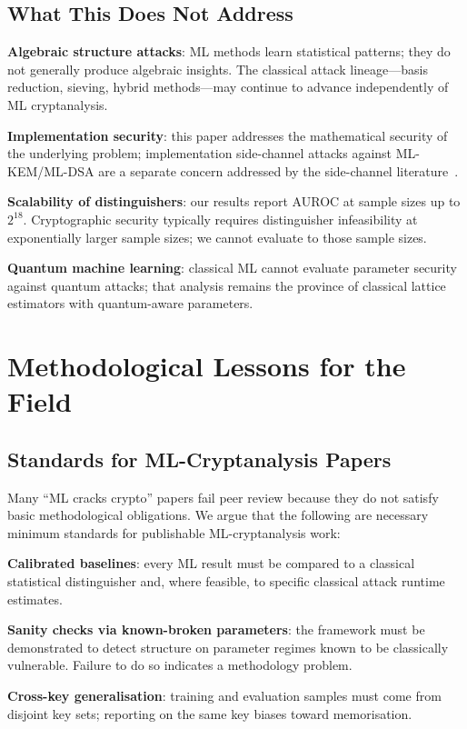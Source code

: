 \documentclass[sigconf,nonacm]{acmart}
\begin{document}
\subsection{What This Does Not Address}

\textbf{Algebraic structure attacks}: ML methods learn statistical
patterns; they do not generally produce algebraic insights. The
classical attack lineage---basis reduction, sieving, hybrid
methods---may continue to advance independently of ML cryptanalysis.

\textbf{Implementation security}: this paper addresses the
mathematical security of the underlying problem; implementation
side-channel attacks against ML-KEM/ML-DSA are a separate concern
addressed by the side-channel literature~\cite{karayalcin2024kyber}.

\textbf{Scalability of distinguishers}: our results report AUROC at
sample sizes up to $2^{18}$. Cryptographic security typically
requires distinguisher infeasibility at exponentially larger
sample sizes; we cannot evaluate to those sample sizes.

\textbf{Quantum machine learning}: classical ML cannot evaluate
parameter security against quantum attacks; that analysis remains
the province of classical lattice estimators with quantum-aware
parameters.

\section{Methodological Lessons for the Field}

\subsection{Standards for ML-Cryptanalysis Papers}

Many ``ML cracks crypto'' papers fail peer review because they do
not satisfy basic methodological obligations. We argue that the
following are necessary minimum standards for publishable
ML-cryptanalysis work:

\textbf{Calibrated baselines}: every ML result must be compared to
a classical statistical distinguisher and, where feasible, to
specific classical attack runtime estimates.

\textbf{Sanity checks via known-broken parameters}: the framework
must be demonstrated to detect structure on parameter regimes known
to be classically vulnerable. Failure to do so indicates a
methodology problem.

\textbf{Cross-key generalisation}: training and evaluation samples
must come from disjoint key sets; reporting on the same key
biases toward memorisation.
\end{document}
